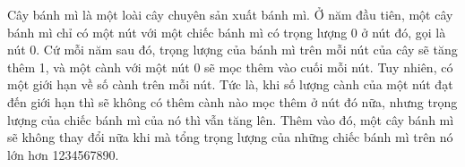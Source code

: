 Cây bánh mì là một loài cây chuyên sản xuất bánh mì. Ở năm đầu tiên, một cây bánh mì chỉ có một nút với một chiếc bánh mì có trọng lượng 0 ở nút đó, gọi là nút 0. Cứ mỗi năm sau đó, trọng lượng của bánh mì trên mỗi nút của cây sẽ tăng thêm 1, và một cành với một nút 0 sẽ mọc thêm vào cuối mỗi nút. Tuy nhiên, có một giới hạn về số cành trên mỗi nút. Tức là, khi số lượng cành của một nút đạt đến giới hạn thì sẽ không có thêm cành nào mọc thêm ở nút đó nữa, nhưng trọng lượng của chiếc bánh mì của nó thì vẫn tăng lên. Thêm vào đó, một cây bánh mì sẽ không thay đổi nữa khi mà tổng trọng lượng của những chiếc bánh mì trên nó lớn hơn 1234567890.